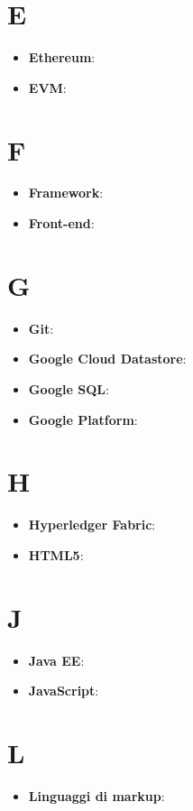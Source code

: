 \documentclass[a4paper, oneside, openany]{article}
\begin{document}
\section{E}
\begin{itemize}
\item \textbf{Ethereum}: 
\item \textbf{EVM}:
\end{itemize}

\section{F}
\begin{itemize}
\item \textbf{Framework}:
\item \textbf{Front-end}:
\end{itemize}

\section{G}
\begin{itemize}
\item \textbf{Git}:
\item \textbf{Google Cloud Datastore}:
\item \textbf{Google SQL}:
\item \textbf{Google Platform}:

\end{itemize}

\section{H}
\begin{itemize}
\item \textbf{Hyperledger Fabric}:
\item \textbf{HTML5}:
\end{itemize}

\section{J}
\begin{itemize}
\item \textbf{Java EE}:
\item \textbf{JavaScript}:
\end{itemize}

\section{L}
\begin{itemize}
\item \textbf{Linguaggi di markup}:
\end{itemize}
\end{document}
